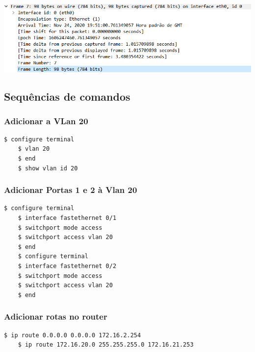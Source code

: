 \documentclass[11pt]{article}
\begin{document}
\includegraphics[width=\textwidth]{figura7.PNG}

\pagebreak

\subsection{Sequências de comandos}

\bigskip

\subsubsection{Adicionar a VLan 20}

\begin{lstlisting}[style=bashStyle]
    $ configure terminal
    $ vlan 20
    $ end
    $ show vlan id 20
\end{lstlisting}

\bigskip

\subsubsection{Adicionar Portas 1 e 2 à Vlan 20}

\begin{lstlisting}[style=bashStyle]
    $ configure terminal
    $ interface fastethernet 0/1
    $ switchport mode access
    $ switchport access vlan 20
    $ end
    $ configure terminal
    $ interface fastethernet 0/2            
    $ switchport mode access
    $ switchport access vlan 20
    $ end
\end{lstlisting}

\bigskip

\subsubsection{Adicionar rotas no router}

\begin{lstlisting}[style=bashStyle]
    $ ip route 0.0.0.0 0.0.0.0 172.16.2.254
    $ ip route 172.16.20.0 255.255.255.0 172.16.21.253
\end{lstlisting}
\end{document}
